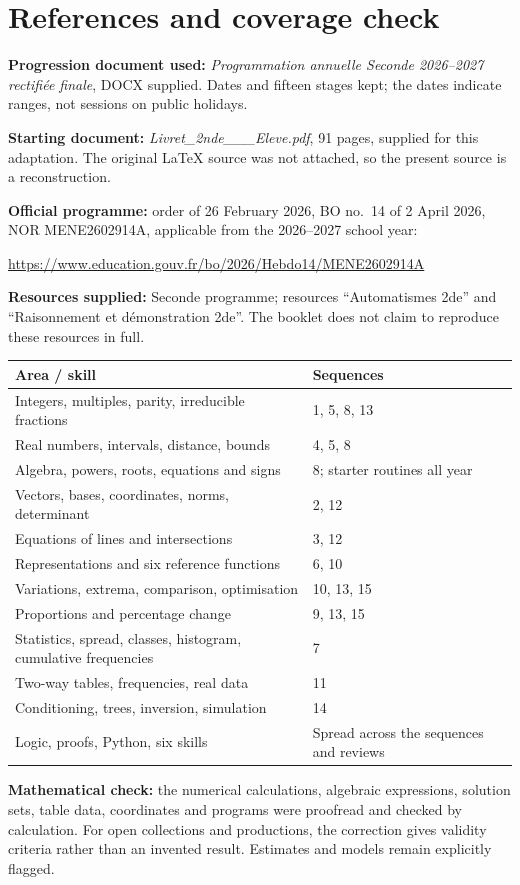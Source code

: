 \section*{References and coverage check}
\textbf{Progression document used:} \emph{Programmation annuelle Seconde 2026--2027 rectifiée finale}, DOCX supplied. Dates and fifteen stages kept; the dates indicate ranges, not sessions on public holidays.
\par\textbf{Starting document:} \emph{Livret\_2nde\_\_\_Eleve.pdf}, 91 pages, supplied for this adaptation. The original LaTeX source was not attached, so the present source is a reconstruction.
\par\textbf{Official programme:} order of 26 February 2026, BO no.~14 of 2 April 2026, NOR MENE2602914A, applicable from the 2026--2027 school year:
\par\url{https://www.education.gouv.fr/bo/2026/Hebdo14/MENE2602914A}
\par\textbf{Resources supplied:} Seconde programme; resources ``Automatismes 2de'' and ``Raisonnement et démonstration 2de''. The booklet does not claim to reproduce these resources in full.
\begin{center}\small{}\begin{tabularx}{\linewidth}{p{8cm} X}
\textbf{Area / skill}&\textbf{Sequences}\\\hline
Integers, multiples, parity, irreducible fractions&1, 5, 8, 13\\
Real numbers, intervals, distance, bounds&4, 5, 8\\
Algebra, powers, roots, equations and signs&8; starter routines all year\\
Vectors, bases, coordinates, norms, determinant&2, 12\\
Equations of lines and intersections&3, 12\\
Representations and six reference functions&6, 10\\
Variations, extrema, comparison, optimisation&10, 13, 15\\
Proportions and percentage change&9, 13, 15\\
Statistics, spread, classes, histogram, cumulative frequencies&7\\
Two-way tables, frequencies, real data&11\\
Conditioning, trees, inversion, simulation&14\\
Logic, proofs, Python, six skills&Spread across the sequences and reviews
\end{tabularx}\end{center}
\textbf{Mathematical check:} the numerical calculations, algebraic expressions, solution sets, table data, coordinates and programs were proofread and checked by calculation. For open collections and productions, the correction gives validity criteria rather than an invented result. Estimates and models remain explicitly flagged.
